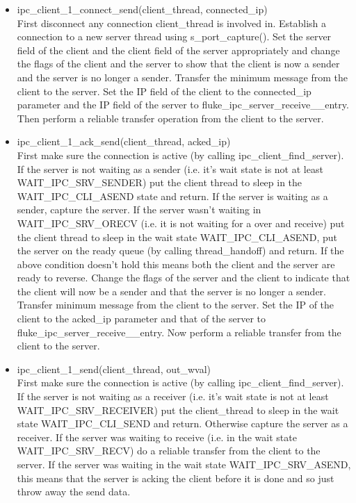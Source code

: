 \begin{itemize}
\item ipc_client_1_connect_send(client_thread, connected_ip)\\ 
  First disconnect any connection client_thread is involved
  in. Establish a
  connection to a new server thread using s_port_capture(). Set the
  server field of the client and the client field of the server
  appropriately and change the flags of the client and the server to
  show that the client is now a sender and the server is no
  longer a sender. Transfer the  minimum message from the client
  to the server. Set the IP field of the client to the connected_ip
  parameter and the IP field of the server to
  fluke_ipc_server_receive__entry. Then perform a reliable transfer
  operation from the client to the server.\\

\item ipc_client_1_ack_send(client_thread, acked_ip)\\  
  First make sure the connection is active (by calling
  ipc_client_find_server). If the server is not waiting as a sender
  (i.e. it's wait state is not at least WAIT_IPC_SRV_SENDER) put the
  client thread to sleep in the WAIT_IPC_CLI_ASEND state and return. 
  If the server is waiting as a sender, capture the server. If the server
  wasn't waiting in WAIT_IPC_SRV_ORECV (i.e. it is not waiting for a
  over and receive) put the client thread to sleep in the wait state
  WAIT_IPC_CLI_ASEND, put the server on the ready queue (by calling
  thread_handoff) and return. If the above condition doesn't hold this
  means both the client and the server are ready to reverse. Change the
  flags of the server and the client to indicate that the client will
  now be a sender and that the server is no longer a sender. Transfer
  minimum message from the client to the server. Set the IP of the client
  to the acked_ip parameter and that of the server to
  fluke_ipc_server_receive__entry. Now perform a reliable transfer
  from the client to the server.
  
\item ipc_client_1_send(client_thread, out_wval)\\
  First make sure the connection is active (by calling
  ipc_client_find_server). If the server is not waiting as a receiver
  (i.e. it's wait state is not at least WAIT_IPC_SRV_RECEIVER) put the
  client_thread to sleep in the wait state WAIT_IPC_CLI_SEND and
  return. Otherwise capture the server as a receiver. If the server
  was waiting to receive (i.e. in the wait state 
  WAIT_IPC_SRV_RECV) do a reliable transfer from the client to the
  server. If the server was waiting in the wait state
  WAIT_IPC_SRV_ASEND, this means that the server is acking the client before
  it is done and so just throw away the send data.


\end{itemize}
